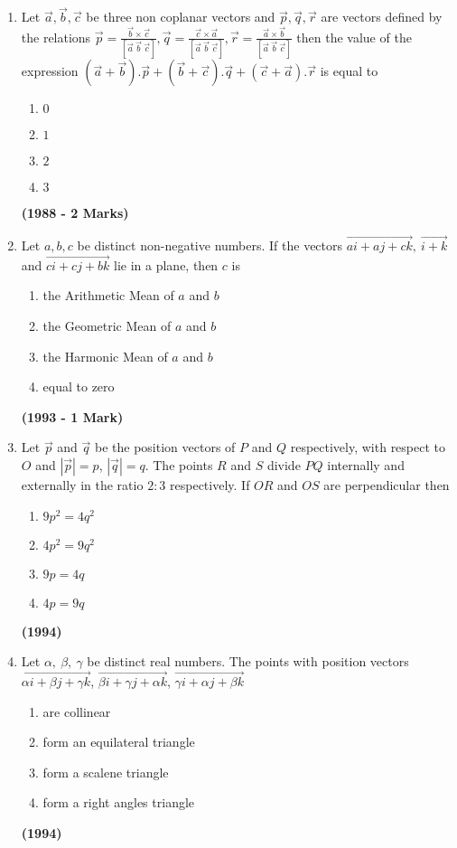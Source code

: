 \documentclass[journal,12pt,twocolumn]{IEEEtran}
\theoremstyle{remark}
\begin{document}
\begin{enumerate}
\item Let $\vec{a}, \vec{b}, \vec{c}$ be three non coplanar vectors and $\vec{p}, \vec{q},\vec{r}$ are vectors defined by the relations $\vec{p}=\frac{\vec{b}\times\vec{c}}{[\vec{a}\ \vec{b}\ \vec{c}]}, \vec{q}=\frac{\vec{c}\times\vec{a}}{[\vec{a}\ \vec{b}\ \vec{c}]},\vec{r}=\frac{\vec{a}\times\vec{b}}{[\vec{a}\ \vec{b}\ \vec{c}]}$ then the value of the expression $(\vec{a}+\vec{b}).\vec{p}+(\vec{b}+\vec{c}).\vec{q}+(\vec{c}+\vec{a}).\vec{r}$ is equal to
\begin{enumerate}[label = (\alph*)]
\item $0$
\item $1$
\item $2$
\item $3$
\end{enumerate}
\hfill{\textbf{(1988 - 2 Marks)}}

\item Let $a, b, c$ be distinct non-negative numbers. If the vectors $\vec{ai + aj + ck},\ \vec{i+k}$ and $\vec{ci+cj+bk}$ lie in a plane, then $c$ is
\begin{enumerate}[label=(\alph*)]
\item the Arithmetic Mean of $a$ and $b$
\item the Geometric Mean of $a$ and $b$
\item the Harmonic Mean of $a$ and $b$
\item equal to zero
\end{enumerate}
\hfill{\textbf{(1993 - 1 Mark)}}

\item Let $\vec{p}$ and $\vec{q}$ be the position vectors of $P$ and $Q$ respectively, with respect to $O$ and $|\vec{p}| = p$, $|\vec{q}| = q$. The points $R$ and $S$ divide $PQ$ internally and externally in the ratio $2:3$ respectively. If $OR$ and $OS$ are perpendicular then
\begin{enumerate}[label = (\alph*)]
\item $9p^2 =4q^2$
\item $4p^2 = 9q^2$
\item $9p = 4q$
\item $4p = 9q$
\end{enumerate}
\hfill{\textbf{(1994)}}

\item Let $\alpha,\ \beta,\ \gamma$ be distinct real numbers. The points with position vectors $\vec{\alpha i+ \beta j + \gamma k}$, $\vec{\beta i+ \gamma j+ \alpha k}$, $\vec{\gamma i + \alpha j + \beta k}$
\begin{enumerate}[label = (\alph*)]
\item are collinear
\item form an equilateral triangle
\item form a scalene triangle
\item form a right angles triangle
\end{enumerate}
\hfill{\textbf{(1994)}}


\end{enumerate}
\end{document}

